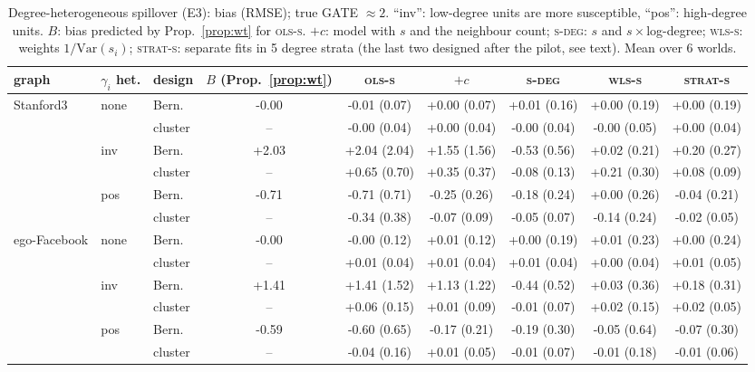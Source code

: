 \begin{table}[t]\centering\footnotesize\setlength{\tabcolsep}{3pt}
\caption{Degree-heterogeneous spillover (E3): bias (RMSE); true GATE $\approx2$. ``inv'': low-degree units are more susceptible, ``pos'': high-degree units. $B$: bias predicted by Prop.~\ref{prop:wt} for \textsc{ols-s}. $+c$: model with $s$ and the neighbour count; \textsc{s-deg}: $s$ and $s\times$log-degree; \textsc{wls-s}: weights $1/\mathrm{Var}(s_i)$; \textsc{strat-s}: separate fits in 5 degree strata (the last two designed after the pilot, see text). Mean over 6 worlds.}
\label{tab:het}
\begin{tabular}{lllcccccc}\toprule
graph & $\gamma_i$ het. & design & $B$ (Prop.~\ref{prop:wt}) & \textsc{ols-s} & $+c$ & \textsc{s-deg} & \textsc{wls-s} & \textsc{strat-s} \\
\midrule
Stanford3 & none & Bern. & -0.00 & -0.01 (0.07) & +0.00 (0.07) & +0.01 (0.16) & +0.00 (0.19) & +0.00 (0.19) \\
 &  & cluster & -- & -0.00 (0.04) & +0.00 (0.04) & -0.00 (0.04) & -0.00 (0.05) & +0.00 (0.04) \\
 & inv & Bern. & +2.03 & +2.04 (2.04) & +1.55 (1.56) & -0.53 (0.56) & +0.02 (0.21) & +0.20 (0.27) \\
 &  & cluster & -- & +0.65 (0.70) & +0.35 (0.37) & -0.08 (0.13) & +0.21 (0.30) & +0.08 (0.09) \\
 & pos & Bern. & -0.71 & -0.71 (0.71) & -0.25 (0.26) & -0.18 (0.24) & +0.00 (0.26) & -0.04 (0.21) \\
 &  & cluster & -- & -0.34 (0.38) & -0.07 (0.09) & -0.05 (0.07) & -0.14 (0.24) & -0.02 (0.05) \\
\midrule
ego-Facebook & none & Bern. & -0.00 & -0.00 (0.12) & +0.01 (0.12) & +0.00 (0.19) & +0.01 (0.23) & +0.00 (0.24) \\
 &  & cluster & -- & +0.01 (0.04) & +0.01 (0.04) & +0.01 (0.04) & +0.00 (0.04) & +0.01 (0.05) \\
 & inv & Bern. & +1.41 & +1.41 (1.52) & +1.13 (1.22) & -0.44 (0.52) & +0.03 (0.36) & +0.18 (0.31) \\
 &  & cluster & -- & +0.06 (0.15) & +0.01 (0.09) & -0.01 (0.07) & +0.02 (0.15) & +0.02 (0.05) \\
 & pos & Bern. & -0.59 & -0.60 (0.65) & -0.17 (0.21) & -0.19 (0.30) & -0.05 (0.64) & -0.07 (0.30) \\
 &  & cluster & -- & -0.04 (0.16) & +0.01 (0.05) & -0.01 (0.07) & -0.01 (0.18) & -0.01 (0.06) \\
\bottomrule\end{tabular}\end{table}
